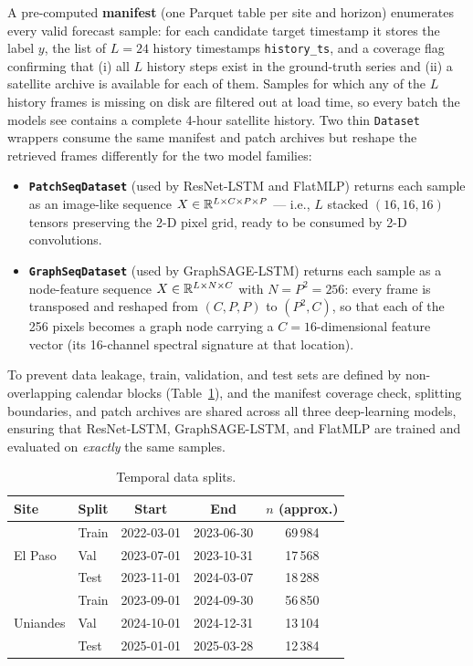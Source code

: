 A pre-computed \textbf{manifest} (one Parquet table per site and horizon)
enumerates every valid forecast sample: for each candidate target timestamp it
stores the label $y$, the list of $L = 24$ history timestamps
\texttt{history\_ts}, and a coverage flag confirming that (i) all $L$ history
steps exist in the ground-truth series and (ii) a satellite archive is
available for each of them. Samples for which any of the $L$ history frames
is missing on disk are filtered out at load time, so every batch the models
see contains a complete 4-hour satellite history. Two thin
\texttt{Dataset} wrappers consume the same manifest and patch archives but
reshape the retrieved frames differently for the two model families:

\begin{itemize}
  \item \textbf{\texttt{PatchSeqDataset}} (used by ResNet-LSTM and FlatMLP)
        returns each sample as an image-like sequence
        $X \in \mathbb{R}^{L \times C \times P \times P}$ --- i.e., $L$ stacked
        $(16, 16, 16)$ tensors preserving the 2-D pixel grid, ready to be
        consumed by 2-D convolutions.
  \item \textbf{\texttt{GraphSeqDataset}} (used by GraphSAGE-LSTM) returns
        each sample as a node-feature sequence $X \in \mathbb{R}^{L \times N \times C}$
        with $N = P^2 = 256$: every frame is transposed and reshaped from
        $(C, P, P)$ to $(P^2, C)$, so that each of the 256 pixels becomes a
        graph node carrying a $C = 16$-dimensional feature vector (its
        16-channel spectral signature at that location).
\end{itemize}

To prevent data leakage, train, validation, and test sets are defined by
non-overlapping calendar blocks (Table~\ref{tab:splits}), and the manifest
coverage check, splitting boundaries, and patch archives are shared across
all three deep-learning models, ensuring that ResNet-LSTM, GraphSAGE-LSTM,
and FlatMLP are trained and evaluated on \emph{exactly} the same samples.

\begin{table}[t]
  \centering
  \caption{Temporal data splits.}
  \label{tab:splits}
  \setlength{\tabcolsep}{4pt}
  \begin{tabular}{llccc}
    \toprule
    \textbf{Site} & \textbf{Split} & \textbf{Start} & \textbf{End} & $n$ (approx.) \\
    \midrule
    \multirow{3}{*}{El Paso}
      & Train & 2022-03-01 & 2023-06-30 & 69\,984 \\
      & Val   & 2023-07-01 & 2023-10-31 & 17\,568 \\
      & Test  & 2023-11-01 & 2024-03-07 & 18\,288 \\
    \midrule
    \multirow{3}{*}{Uniandes}
      & Train & 2023-09-01 & 2024-09-30 & 56\,850 \\
      & Val   & 2024-10-01 & 2024-12-31 & 13\,104 \\
      & Test  & 2025-01-01 & 2025-03-28 & 12\,384 \\
    \bottomrule
  \end{tabular}
\end{table}

